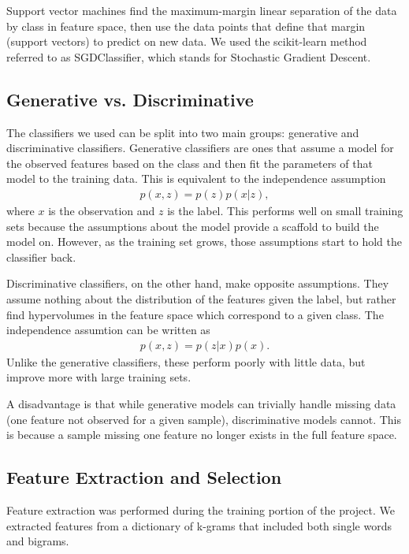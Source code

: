 \documentclass{article} %
\begin{document}
	Support vector machines find the maximum-margin linear separation of the data by class in feature space, then use the data points that define that margin (support vectors) to predict on new data. We used the scikit-learn method referred to as SGDClassifier, which stands for Stochastic Gradient Descent.
		
	\subsection{Generative vs. Discriminative}
	
	The classifiers we used can be split into two main groups: generative and discriminative classifiers. Generative classifiers are ones that assume a model for the observed features based on the class and then fit the parameters of that model to the training data. This is equivalent to the independence assumption
	\begin{align}
	p(x,z) = p(z)p(x|z),
	\end{align}
	where $x$ is the observation and $z$ is the label. This performs well on small training sets because the assumptions about the model provide a scaffold to build the model on. However, as the training set grows, those assumptions start to hold the classifier back.
	
	Discriminative classifiers, on the other hand, make opposite assumptions. They assume nothing about the distribution of the features given the label, but rather find hypervolumes in the feature space which correspond to a given class. The independence assumtion can be written as 
	\begin{align}
	p(x,z) = p(z|x)p(x).
	\end{align}
	Unlike the generative classifiers, these perform poorly with little data, but improve more with large training sets. 
	
	A disadvantage is that while generative models can trivially handle missing data (one feature not observed for a given sample), discriminative models cannot. This is because a sample missing one feature no longer exists in the full feature space.
	
	\subsection{Feature Extraction and Selection}
	
	Feature extraction was performed during the training portion of the project. We extracted features from a dictionary of k-grams that included both single words and bigrams. 
	
\end{document}
